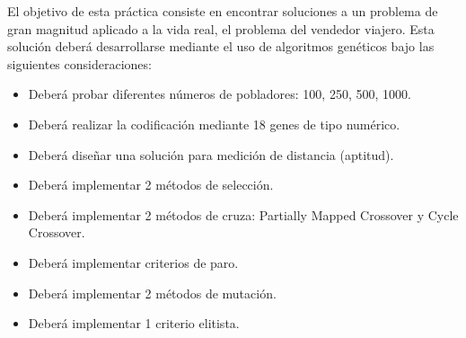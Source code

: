 El objetivo de esta práctica consiste en encontrar soluciones a un problema de gran magnitud aplicado a la vida real, el problema del vendedor viajero. Esta solución deberá desarrollarse mediante el uso de algoritmos genéticos bajo las siguientes consideraciones:

\begin{itemize}
	\item Deberá probar diferentes números de pobladores: 100, 250, 500, 1000.
	\item Deberá realizar la codificación mediante 18 genes de tipo numérico.
	\item Deberá diseñar una solución para medición de distancia (aptitud).
	\item Deberá implementar 2 métodos de selección.
	\item Deberá implementar 2 métodos de cruza: Partially Mapped Crossover y Cycle Crossover.
	\item Deberá implementar criterios de paro.
	\item Deberá implementar 2 métodos de mutación.
	\item Deberá implementar 1 criterio elitista.
\end{itemize}
